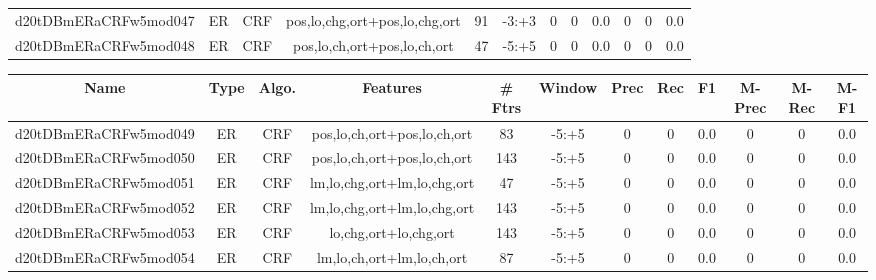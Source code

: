 \documentclass[a4paper]{article}
\begin{document}
\begin{landscape}
\begin{center}
\begin{tabular}{ |c|c|c|c|c|c|c|c|c|c|c|c|}
 
 	
 	\small{ d20tDBmERaCRFw5mod047 } & ER & CRF & pos,lo,chg,ort+pos,lo,chg,ort  &  91 &  -3:+3  &  0 & 0 & 0.0  &  0 & 0 & 0.0 \\
 	

 
 	
 	\small{ d20tDBmERaCRFw5mod048 } & ER & CRF & pos,lo,ch,ort+pos,lo,ch,ort  &  47 &  -5:+5  &  0 & 0 & 0.0  &  0 & 0 & 0.0 \\
 	
 \hline
\end{tabular}
\end{center}




\begin{center}
\begin{tabular}{ |c|c|c|c|c|c|c|c|c|c|c|c|} 
 \hline
 	Name & Type & Algo. & Features & \# Ftrs & Window & Prec & Rec & F1 & M-Prec & M-Rec & M-F1\\
 \hline

 	

 
 	
 	\small{ d20tDBmERaCRFw5mod049 } & ER & CRF & pos,lo,ch,ort+pos,lo,ch,ort  &  83 &  -5:+5  &  0 & 0 & 0.0  &  0 & 0 & 0.0 \\
 	

 
 	
 	\small{ d20tDBmERaCRFw5mod050 } & ER & CRF & pos,lo,ch,ort+pos,lo,ch,ort  &  143 &  -5:+5  &  0 & 0 & 0.0  &  0 & 0 & 0.0 \\
 	

 
 	
 	\small{ d20tDBmERaCRFw5mod051 } & ER & CRF & lm,lo,chg,ort+lm,lo,chg,ort  &  47 &  -5:+5  &  0 & 0 & 0.0  &  0 & 0 & 0.0 \\
 	

 
 	
 	\small{ d20tDBmERaCRFw5mod052 } & ER & CRF & lm,lo,chg,ort+lm,lo,chg,ort  &  143 &  -5:+5  &  0 & 0 & 0.0  &  0 & 0 & 0.0 \\
 	

 
 	
 	\small{ d20tDBmERaCRFw5mod053 } & ER & CRF & lo,chg,ort+lo,chg,ort  &  143 &  -5:+5  &  0 & 0 & 0.0  &  0 & 0 & 0.0 \\
 	

 
 	
 	\small{ d20tDBmERaCRFw5mod054 } & ER & CRF & lm,lo,ch,ort+lm,lo,ch,ort  &  87 &  -5:+5  &  0 & 0 & 0.0  &  0 & 0 & 0.0 \\
 	


\end{tabular}
\end{center}
\end{landscape}
\end{document}
